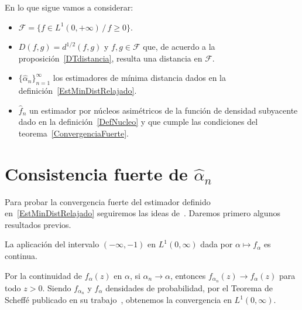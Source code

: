 \vspace{1cm}

En lo que sigue vamos a considerar:
\begin{itemize}
	\item $\mathcal{F}=\{f \in L^1(0,+\infty) \, / \, f \geq 0\}$.
	\item $D(f,g)=d^{1/2}(f,g)$ y $f,g \in \mathcal{F} $ que, de acuerdo a la proposición~\ref{DTdistancia}, resulta una distancia en $\mathcal{F}$.
	\item $\{\widehat{\alpha}_n\}_{n=1}^{\infty}$ los estimadores de mínima distancia dados en la definición~\eqref{EstMinDistRelajado}.
	\item $\widehat{f}_n$ un estimador por núcleos asimétricos de la función de densidad subyacente dado en la definición~\ref{DefNucleo} y que cumple las condiciones del teorema~\ref{ConvergenciaFuerte}.
\end{itemize}

\section{Consistencia fuerte de $\widehat{\alpha}_{n}$}

\vspace{0.5cm}

Para probar la convergencia fuerte del estimador definido en~\eqref{EstMinDistRelajado} seguiremos las ideas de~\citet{parr1982}. Daremos primero algunos resultados previos.

\begin{proposition}
	\label{continuidad}
	La aplicación del intervalo $(-\infty,-1)$ en $L^{1}(0,\infty)$ dada por
	$\alpha \mapsto f_{\alpha}$ es continua.
\end{proposition}
\begin{dem}
	Por la continuidad de $f_{\alpha}(z)$ en $\alpha$, si $\alpha_{n} \to \alpha$, 
	entonces $f_{\alpha_{n}}(z) \to f_{\alpha}(z)$ para todo $z>0$.
	Siendo $f_{\alpha_{n}}$ y $f_{\alpha}$ densidades de probabilidad, por el Teorema de Scheffé publicado en su trabajo~\citet{scheffe1947}, obtenemos
	la convergencia en $L^{1}(0,\infty)$.
\end{dem}

